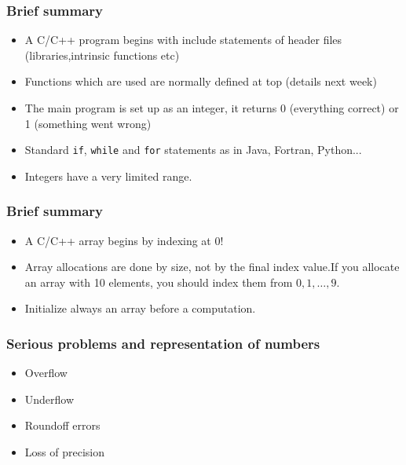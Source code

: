 \documentclass[handout]{beamer}
\newenvironment{block_mdfboxadmon}[1][]{\begin{block}{#1}}{\end{block}}
\begin{document}
\begin{frame}
\frametitle{Brief summary}

\begin{block_mdfboxadmon}[C/C++ program.]
\begin{itemize}
  \item A C/C++ program begins with include statements of header files (libraries,intrinsic functions etc)

  \item Functions which are used are normally defined at top (details next week)

  \item The main program is set up as an integer, it returns 0 (everything correct) or 1 (something went wrong)

  \item Standard \Verb!if!, \Verb!while! and \Verb!for! statements as in Java, Fortran, Python...

  \item Integers have a very limited range.
\end{itemize}

\noindent
\end{block_mdfboxadmon}
\end{frame}

\begin{frame}
\frametitle{Brief summary}

\begin{block_mdfboxadmon}[Arrays.]
\begin{itemize}
  \item A C/C++ array begins by indexing at 0!

  \item Array allocations are done by size, not by the final index value.If you allocate an array with 10 elements, you should index them from $0,1,\dots, 9$.

  \item Initialize always an array before a computation.
\end{itemize}

\noindent
\end{block_mdfboxadmon}
\end{frame}

\begin{frame}
\frametitle{Serious problems and representation of numbers}

\begin{block_mdfboxadmon}

\begin{itemize}
  \item Overflow

  \item Underflow

  \item Roundoff errors

  \item Loss of precision
\end{itemize}

\noindent
\end{block_mdfboxadmon}
\end{frame}
\end{document}
